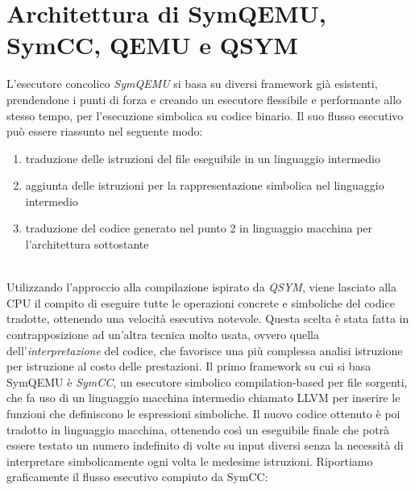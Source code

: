 \documentclass[Lau, oneside]{sapthesis}%
\begin{document}
\section{Architettura di SymQEMU, SymCC, QEMU e QSYM}
L'esecutore concolico \textit{SymQEMU} si basa su diversi framework già esistenti, prendendone i punti di forza e creando un esecutore flessibile e performante allo stesso tempo, per l'esecuzione simbolica su codice binario.
\newline \newline
Il suo flusso esecutivo può essere riassunto nel seguente modo:
\begin{enumerate}
    \item traduzione delle istruzioni del file eseguibile in un linguaggio intermedio
    \item aggiunta delle istruzioni per la rappresentazione simbolica nel linguaggio intermedio
    \item traduzione del codice generato nel punto 2 in linguaggio macchina per l'architettura sottostante
\end{enumerate}
\ \\
Utilizzando l'approccio alla compilazione ispirato da \textit{QSYM}, viene lasciato alla CPU il compito di eseguire tutte le operazioni concrete e simboliche del codice tradotte, ottenendo una velocità esecutiva notevole.
\newline
Questa scelta è stata fatta in contrapposizione ad un'altra tecnica molto usata, ovvero quella dell'\textit{interpretazione} del codice, che favorisce una più complessa analisi istruzione per istruzione al costo delle prestazioni.
\newline \newline
Il primo framework su cui si basa SymQEMU è \textit{SymCC}, un esecutore simbolico compilation-based per file sorgenti, che fa uso di un linguaggio macchina intermedio chiamato LLVM per inserire le funzioni che definiscono le espressioni simboliche.
\newline
Il nuovo codice ottenuto è poi tradotto in linguaggio macchina, ottenendo così un eseguibile finale che potrà essere testato un numero indefinito di volte su input diversi senza la necessità di interpretare simbolicamente ogni volta le medesime istruzioni.
\newline \newline
Riportiamo graficamente il flusso esecutivo compiuto da SymCC:
\end{document}
